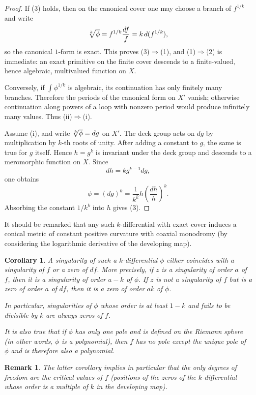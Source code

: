 \documentclass[reqno]{amsart}
\newtheorem{remark}{Remark}
\newtheorem{cor}{Corollary}
\theoremstyle{definition}
\theoremstyle{remark}
\theoremstyle{definition}
\theoremstyle{definition}
\theoremstyle{definition}
\begin{document}
\begin{proof}
If (3) holds, then on the canonical cover one may choose a branch of $f^{1/k}$ and write
\[
 \root k \of \phi=f^{1/k}\frac{df}{f}=k\,d(f^{1/k}),
\]
so the canonical $1$-form is exact. This proves (3)$\Rightarrow$(1), and (1)$\Rightarrow$(2) is immediate: an exact primitive on the finite cover descends to a finite-valued, hence algebraic, multivalued function on $X$.

Conversely, if $\int\phi^{1/k}$ is algebraic, its continuation has only finitely many branches. Therefore the periods of the canonical form on $X'$ vanish; otherwise continuation along powers of a loop with nonzero period would produce infinitely many values. Thus (ii)$\Rightarrow$(i).

Assume (i), and write $\root k \of \phi=dg$ on $X'$. The deck group acts on $dg$ by multiplication by $k$-th roots of unity. After adding a constant to $g$, the same is true for $g$ itself. Hence $h=g^k$ is invariant under the deck group and descends to a meromorphic function on $X$. Since
\[
 dh=k g^{k-1}dg,
\]
one obtains
\[
 \phi=(dg)^k=\frac{1}{k^k}h\left(\frac{dh}{h}\right)^k.
\]
Absorbing the constant $1/k^k$ into $h$ gives (3).
\end{proof}

It should be remarked that any such $k$-differential with exact cover induces a conical metric of constant positive curvature with coaxial monodromy (by considering the logarithmic derivative of the developing map).

\begin{cor}
A singularity of such a $k$-differential $\phi$ either coincides with a singularity of $f$ or a zero of $df$. More precisely, if $z$ is a singularity of order $a$ of $f$, then it is a singularity of order $a-k$ of $\phi$. If $z$ is not a singularity of $f$ but is a zero of order $a$ of $df$, then it is a zero of order $ak$ of $\phi$.

In particular, singularities of $\phi$ whose order is at least $1-k$ and fails to be divisible by $k$ are always zeros of $f$.

It is also true that if $\phi$ has only one pole and is defined on the Riemann sphere (in other words, $\phi$ is a polynomial), then $f$ has no pole except the unique pole of $\phi$ and is therefore also a polynomial.
\end{cor}

\begin{remark}
The latter corollary implies in particular that the only degrees of freedom are the critical values of $f$ (positions of the zeros of the $k$-differential whose order is a multiple of $k$ in the developing map).
\end{remark} 
\end{document}
